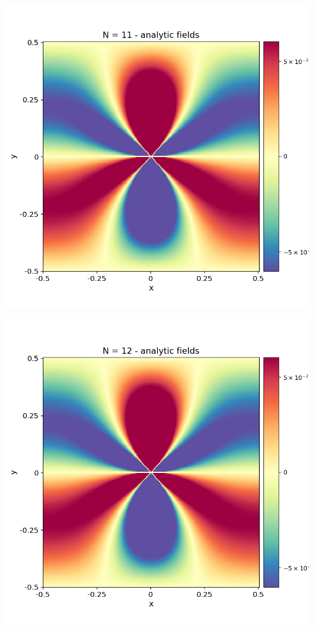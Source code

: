 \documentclass[12pt,a4paper]{article}
\theoremstyle{plain}
\begin{document}
\begin{minipage}{0.24\textwidth}
	\centering
	\includegraphics[width=\textwidth]{../stress_field_11.png}
\end{minipage}	
\begin{minipage}{0.24\textwidth}
	\centering
	\includegraphics[width=\textwidth]{../stress_field_12.png}
\end{minipage}
\end{document}
